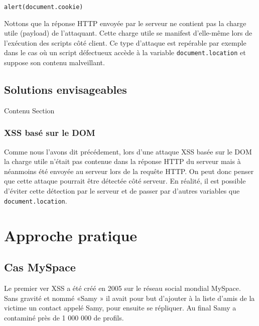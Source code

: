 \documentclass[a4paper,12pt]{report}
\begin{document}
  \lstinline{alert(document.cookie)}

  Nottons que la réponse HTTP envoyée par le serveur ne contient pas la charge utile (payload) de l'attaquant. Cette charge utile se manifest d'elle-même lors de l'exécution des scripts côté client. Ce type d'attaque est repérable par exemple dans le cas où un script défectueux accède à la variable \lstinline{document.location} et suppose son contenu malveillant.


    \newpage

  \section{Solutions envisageables}
    Contenu Section

    \subsection{XSS basé sur le DOM} %
    \label{sub:xss_bas_sur_le_dom}
    Comme nous l'avons dit précédement, lors d'une attaque XSS basée sur le DOM la charge utile n'était pas contenue dans la réponse HTTP du serveur mais à néanmoins été envoyée au serveur lors de la requête HTTP. On peut donc penser que cette attaque pourrait être détectée côté serveur. En réalité, il est possible d'éviter cette détection par le serveur et de passer par d'autres variables que \lstinline{document.location}.






    \newpage
  \chapter{Approche pratique} %

  \section{Cas MySpace}
Le premier ver XSS a été créé en 2005 sur le réseau social mondial MySpace. Sans gravité et nommé «Samy » il avait pour but d’ajouter à la liste d’amis de la victime un contact appelé Samy, pour ensuite se répliquer. Au final Samy a contaminé près de 1 000 000 de profils. \\
\end{document}
